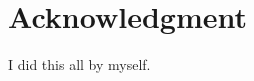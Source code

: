 \documentclass[conference]{IEEEtran}
\begin{document}


\section*{Acknowledgment}

I did this all by myself.





\raggedright


\end{document}
